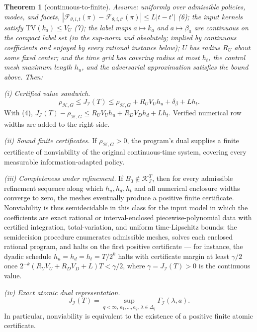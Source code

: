\documentclass[10pt,twocolumn]{article}
\theoremstyle{plain}
\newtheorem{theorem}{Theorem}
\theoremstyle{definition}
\theoremstyle{remark}
\begin{document}
\begin{theorem}[continuous-to-finite]\label{thm:bridge}
Assume: uniformly over admissible policies, modes, and facets,
\(|\mathcal{F}_{\theta,i,t}(\pi) - \mathcal{F}_{\theta,i,t'}(\pi)| \le
L|t - t'|\) (6); the input kernels satisfy \(\mathrm{TV}(k_a) \le V_U\) (7); the label
maps \(a \mapsto k_a\) and \(a \mapsto \beta_a\) are continuous on
the compact label set (in the sup-norm and absolutely; implied by
continuous coefficients and enjoyed by every rational instance below);
\(U\) has radius \(R_U\) about some fixed center; and the time grid has
covering radius at most \(h_t\), the control mesh maximum length \(h_u\),
and the adversarial approximation satisfies the bound above. Then:
\end{theorem}

\noindent\emph{(i) Certified value sandwich.}
\[
\rho_{\mathcal{H},G} \le J_{\mathcal{I}}(T) \le \rho_{\mathcal{H},G}
+ R_U V_U h_u + \delta_\beta + L h_t.
\tag{8}
\]
With (4), \(J_{\mathcal{I}}(T) - \rho_{\mathcal{H},G} \le R_U V_U h_u + R_D
V_D h_d + L h_t\). Verified numerical row widths are added to the right side.

\noindent\emph{(ii) Sound finite certificates.} If \(\rho_{\mathcal{H},G} > 0\), the
program's dual supplies a finite certificate of nonviability of the original
continuous-time system, covering every measurable information-adapted policy.

\noindent\emph{(iii) Completeness under refinement.} If
\(B_0 \notin \mathcal{K}_{\mathcal{I}}^T\), then for every admissible
refinement sequence along which \(h_u, h_d, h_t\) and all numerical
enclosure widths converge to zero, the meshes eventually produce a positive
finite certificate. Nonviability is thus semidecidable in this class for
the input model in which the coefficients are exact rational or
interval-enclosed piecewise-polynomial data with certified integration,
total-variation, and uniform time-Lipschitz bounds: the semidecision
procedure enumerates admissible meshes, solves each enclosed rational
program, and halts on the first positive certificate --- for instance, the
dyadic schedule \(h_u = h_d = h_t = T/2^k\) halts with certificate margin
at least \(\gamma/2\) once \(2^{-k}(R_U V_U + R_D V_D + L)T < \gamma/2\),
where \(\gamma = J_{\mathcal{I}}(T) > 0\) is the continuous value.

\noindent\emph{(iv) Exact atomic dual representation.}
\[
J_{\mathcal{I}}(T) = \sup_{q < \infty,\ a_1,\dots,a_q,\
\lambda \in \Delta_q} \Gamma_{\mathcal{I}}(\lambda, a).
\tag{9}
\]
In particular, nonviability is equivalent to the existence of a positive
finite atomic certificate.
\end{document}
